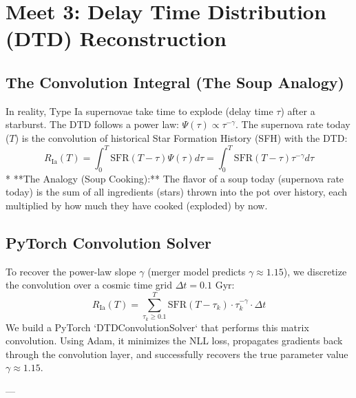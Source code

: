 \documentclass[11pt,a4paper]{article}
\begin{document}
\section{Meet 3: Delay Time Distribution (DTD) Reconstruction}

\subsection{The Convolution Integral (The Soup Analogy)}
In reality, Type Ia supernovae take time to explode (delay time $\tau$) after a starburst. The DTD follows a power law: $\Psi(\tau) \propto \tau^{-\gamma}$.
The supernova rate today ($T$) is the convolution of historical Star Formation History (SFH) with the DTD:
$$R_{\text{Ia}}(T) = \int_0^T \text{SFR}(T - \tau) \Psi(\tau) d\tau = \int_0^T \text{SFR}(T - \tau) \tau^{-\gamma} d\tau$$
*   **The Analogy (Soup Cooking):** The flavor of a soup today (supernova rate today) is the sum of all ingredients (stars) thrown into the pot over history, each multiplied by how much they have cooked (exploded) by now.

\subsection{PyTorch Convolution Solver}
To recover the power-law slope $\gamma$ (merger model predicts $\gamma \approx 1.15$), we discretize the convolution over a cosmic time grid $\Delta t = 0.1\text{ Gyr}$:
$$R_{\text{Ia}}(T) = \sum_{\tau_k \ge 0.1}^{T} \text{SFR}(T - \tau_k) \cdot \tau_k^{-\gamma} \cdot \Delta t$$
We build a PyTorch `DTDConvolutionSolver` that performs this matrix convolution. Using Adam, it minimizes the NLL loss, propagates gradients back through the convolution layer, and successfully recovers the true parameter value $\gamma \approx 1.15$.

---
\end{document}
